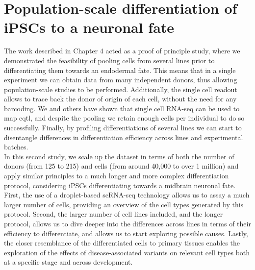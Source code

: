 
\chapter{Population-scale differentiation of iPSCs to a neuronal fate}
\label{chapter5}

The work described in Chapter 
4 acted as a proof of principle study, where we demonstrated the feasibility of pooling cells from several lines prior to differentiating them towards an endodermal fate.
This means that in a single experiment we can obtain data from many independent donors, thus allowing population-scale studies to be performed.
Additionally, the single cell readout allows to trace back the donor of origin of each cell, without the need for any barcoding.
We and others have shown that single cell RNA-seq can be used to map \gls{eqtl}, and despite the pooling we retain enough cells per individual to do so successfully.
Finally, by profiling differentiations of several lines we can start to disentangle differences in differentiation efficiency across lines and experimental batches. \\

In this second study, we scale up the dataset in terms of both the number of donors (from 125 to 215) and cells (from around 40,000 to over 1 million) and apply similar principles to a much longer and more complex differentiation protocol, considering iPSCs differentiating towards a midbrain neuronal fate.
First, the use of a droplet-based scRNA-seq technology allows us to assay a much larger number of cells, providing an overview of the 
cell types generated by this protocol. 
Second, the larger number of cell lines included, and the longer protocol, allows us to dive deeper into the differences across lines in terms of their efficiency to differentiate, and allows us to start exploring possible causes.
Lastly, the closer resemblance of the differentiated cells to primary tissues enables the exploration of the effects of disease-associated variants on relevant cell types both at a specific stage and across development. 

